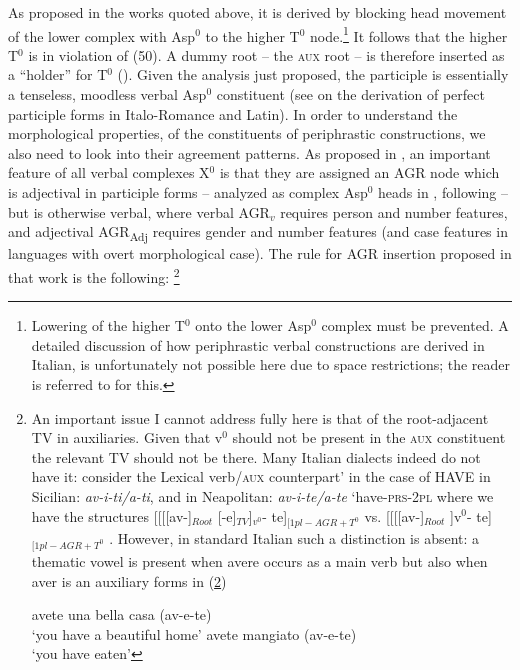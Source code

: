 \documentclass[output=paper]{langscibook}
\begin{document}
As proposed in the works quoted above, it is derived by blocking head movement of the lower complex with Asp$^0$ to the higher T$^0$ node.\footnote{Lowering of the higher T$^0$ onto the lower Asp$^0$ complex must be prevented. A detailed discussion of how periphrastic verbal constructions are derived in Italian, is unfortunately not possible here due to space restrictions; the reader is referred to \citet{calabrese2019a} for this.} It follows that the higher T$^0$ is in violation of (50).  A dummy root -- the \textsc{aux} root -- is therefore inserted as a “holder” for T$^0$ (\citealt{bjorkman2011a}). Given the analysis just proposed, the participle is essentially a tenseless, moodless verbal Asp$^0$ constituent (see \citealt{calabrese2020a} on the derivation of perfect participle forms in Italo-Romance and Latin).
 In order to understand the morphological properties, of the constituents of periphrastic constructions, we also need to look into their agreement patterns.  As proposed in \citet{calabrese2019a}, an important feature of all verbal complexes X$^0$ is that they are assigned an AGR node which is adjectival in participle forms --  analyzed as complex Asp$^0$ heads in \citet{calabrese2019a}, following \citet{embick2000a, embick2004a} --  but is otherwise verbal, where verbal AGR$_v$ requires person and number features, and adjectival AGR\textsubscript{Adj} requires gender and number features (and case features in languages with overt morphological case). The rule for AGR insertion proposed in that work is the following: \footnote{An important issue I cannot address fully here is that of the root-adjacent TV in auxiliaries.  Given that v$^0$ should not be present in the \textsc{aux} constituent the relevant TV should not be there.  Many Italian dialects indeed do not have it: consider the  Lexical verb\slash \textsc{aux} counterpart’ in the case of HAVE in Sicilian: \textit{av-i-ti/a-ti}, and  in Neapolitan: \textit{av-i-te/a-te} ‘have-\textsc{prs}-\textsc{2pl} where we have the structures [[[[av-]$_{Root}$ [-e]$_{TV}$]$_{v^0}$- te]$_{[1pl-AGR+T^0}$  vs. [[[[av-]$_{Root}$ ]v$^0$- te]$_{[1pl-AGR+T^0}$ . However, in standard Italian such a distinction is absent: a thematic vowel is present when avere occurs as a main verb but also when aver is an auxiliary forms in (\ref{fn38exb})

 \ea \label{fn38ex}
    \ea \label{fn38exa}avete una bella casa (av-e-te)\\
   ‘you have a beautiful home’
    \ex \label{fn38exb}avete mangiato (av-e-te)\\
   ‘you have eaten’
    \z
 \z

}
\end{document}
